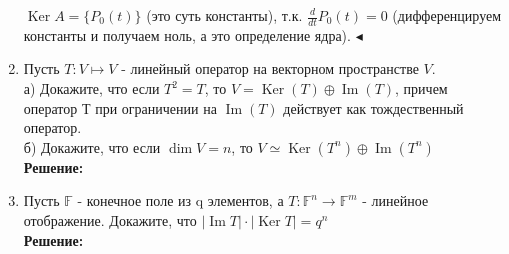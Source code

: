 \documentclass[]{book}
\theoremstyle{definition}
\newcommand{\bb}[1]{\mathbb{#1}}
\DeclareMathOperator{\Ima}{Im}
\DeclareMathOperator{\Ker}{Ker}
\begin{document}
\begin{enumerate}[resume]
$\Ker A = \{ P_0(t)\}$ (это суть константы), т.к. $\frac{d}{dt}P_0(t) = 0$ (дифференцируем константы и получаем ноль, а это определение ядра).
$\blacktriangleleft$


\item Пусть $T \colon V \mapsto V$ - линейный оператор на векторном пространстве $V$. \\
а) Докажите, что если $T^2=T$, то $V=\Ker(T)\oplus \Ima(T)$, причем оператор Т при ограничении на $\Ima(T)$ действует как тождественный оператор.\\
б) Докажите, что если $\dim V=n$, то $V \simeq \Ker(T^n)\oplus \Ima(T^n)$\\

\textbf{Решение:}


\item Пусть $\bb{F}$ - конечное поле из q элементов, а $T:\bb{F}^n \rightarrow \bb{F}^m$ -  линейное отображение. Докажите, что $|\Ima T|\cdot |\Ker T|=q^n$\\

\textbf{Решение:}






\end{enumerate}
\end{document}
